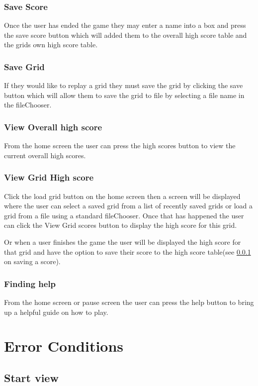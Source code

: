 \documentclass{project}
\begin{document}
		\subsubsection{Save Score} \label{Save score}
			Once the user has ended the game they may enter a name into a box and press the save score button which will added them to the overall high score table and the grids own high score table.
		\subsubsection{Save Grid}	\label{Save grid}
			If they would like to replay a grid they must save the grid by clicking the save button which will allow them to save the grid to file by selecting a file name in the fileChooser.
		\subsubsection{View Overall high score} \label{View Overall highscore}
		From the home screen the user can press the high scores button to view the current overall high scores.
		\subsubsection{View Grid High score} \label{View Grid HigScore}
		Click the load grid button on the home screen then a screen will be displayed where the user can select a saved grid from a list of recently saved grids or load a grid from a file using a standard fileChooser. Once that has happened the user can click the View Grid scores button to display the high score for this grid.
		
		Or when a user finishes the game the user will be displayed the high score for that grid and have the option to save their score to the high score table(see \ref{Save score}  on saving a score).
		\subsubsection{Finding help} \label{Finding help}
		From the home screen or pause screen the user can press the help button to bring up a helpful guide on how to play.
		
\section{Error Conditions}

\subsection{Start view} \label{Start View}
\end{document}
